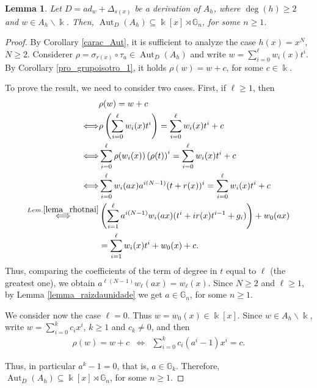 \documentclass{article}
\numberwithin{equation}{section}\theoremstyle{plain}
\newtheorem{lemma}[theorem]{Lemma}
\DeclareMathOperator{\Aut}{Aut}
\begin{document}
\begin{lemma}\label{lema_finito_hmaior2}
    Let $D=ad_w+\Delta_{s(x)}$ be a derivation of $A_h$, where $\deg(h)\geq 2$ and $w \in A_h\backslash \Bbbk$.
    Then,  $\Aut_D(A_h) \subseteq \Bbbk[x] \rtimes \mathbb{G}_n$, for some $n \geq 1$.
\end{lemma}
\begin{proof}
By Corollary \ref{carac_Aut}, it is sufficient to analyze the case $h(x)=x^N$, $N\geq2$.
     Considerer $\rho = \sigma_{r(x)} \circ \tau_a \in \Aut_D(A_h)$
and write $w=\sum_{i=0}^\ell w_i(x) t^i$.
By Corollary \ref{pro_grupoisotro_1}, it holds $\rho(w)=w+c$, for some $c \in \Bbbk$.

To prove the result, we need to consider two cases.
First, if $\ell\geq 1$, then
\begin{align*}
& \rho(w) = w + c  \\
\Longleftrightarrow & \rho\left(\sum_{i=0}^\ell w_i(x) t^i \right) = \sum_{i=0}^\ell w_i(x) t^i + c \\
\Longleftrightarrow & \sum_{i=0}^\ell \rho(w_i(x)) \left(\rho(t)\right)^i = \sum_{i=0}^\ell w_i(x) t^i + c \\
\Longleftrightarrow & \sum_{i=0}^\ell w_i(ax)a^{i(N-1)}(t+r(x))^i = \sum_{i=0}^\ell w_i(x) t^i + c \\
\stackrel{Lem. \ref{lema_rhotnai}}{\Longleftrightarrow} & \left(\sum_{i=1}^\ell a^{i(N-1)} w_i(ax) (t^i+ir(x)t^{i-1}+g_i) \right)  + w_0(ax) \\
& = \sum_{i=1}^\ell w_i(x) t^i + w_0(x) + c.
\end{align*}
Thus, comparing the coefficients of the term of degree in $t$ equal to $\ell$ (the greatest one), we obtain
$a^{\ell(N-1)}w_\ell (ax)=w_{\ell}(x)$.
Since $N\geq 2$ and $\ell \geq 1$, by Lemma \ref{lemma_raizdaunidade} we get $a\in \mathbb{G}_n$, for some $n \geq 1$.

We consider now the case $\ell=0$.
Thus $w = w_0(x) \in \Bbbk[x]$.
Since $w \in A_h\backslash \Bbbk$, write $w=\sum_{i=0}^k c_ix^i$, $k \geq 1$ and $c_k\neq 0$, and then
    \begin{eqnarray*}
        \rho(w) = w + c 
        &\Longleftrightarrow & \sum_{i=0}^k c_i(a^i-1)x^i=c.
    \end{eqnarray*}
    
    Thus, in particular $a^k-1 =0$, that is, $a \in \mathbb{G}_k$. Therefore, $\Aut_D(A_h) \subseteq \Bbbk[x] \rtimes \mathbb{G}_n$, for some $n \geq 1$.
\end{proof}
\end{document}
